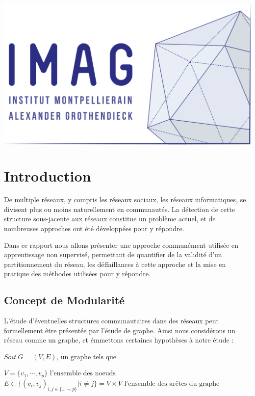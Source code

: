 \documentclass[frenchb]{report}
\newcommand{\1}{\mathbbm{1}}
\theoremstyle{definition}\newtheorem{defn}{Définition}
\theoremstyle{definition}\newtheorem{exm}{Exemple}
\theoremstyle{definition}\newtheorem{nota}{Notation}
\theoremstyle{definition}\newtheorem{rem}{Remarque}
\begin{document}
\begin{titlepage}
\begin{center}
\includegraphics[scale=0.7]{imag_logo.png}

\end{center}
\end{titlepage}
\tableofcontents
\newpage

\chapter*{Introduction}

De multiple réseaux, y compris les réseaux sociaux, les réseaux informatiques, se divisent plus ou moins naturellement en communautés. La détection de cette structure sous-jacente aux réseaux constitue un problème actuel, et de nombreuses approches ont été développées pour y répondre. 

Dans ce rapport nous allons présenter une approche communément utilisée en apprentissage non supervisé, permettant de quantifier de la validité d'un partitionnement du réseau, les déffaillances à cette approche et la mise en pratique des méthodes utilisées pour y répondre. 

\section*{Concept de Modularité}
L'étude d'éventuelles structures communautaires dans des réseaux peut formellement être présentée par l'étude de graphe. Ainsi nous considérons un réseau comme un graphe, et émmettons certaines hypothèses à notre étude : 

\begin{center}
$Soit~G = (V,E)\text{, un graphe tels que }$
\end{center}
$V = \{v_1, \cdots, v_p\} \text{ l'ensemble des noeuds }$\newline
$E \subset{\{ (v_i,v_j)_{i,j \in \{1,\cdots,p\}}| i \neq j \}} = V\times V \text{ l'ensemble des arêtes du graphe}$\
\end{document}
